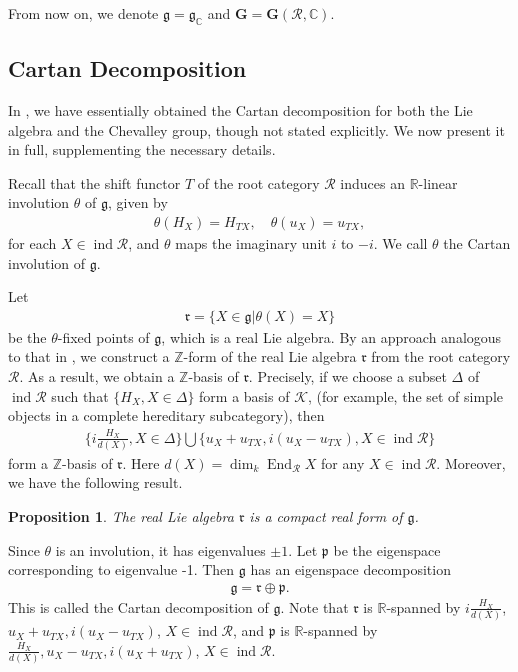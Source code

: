 \documentclass[12pt]{amsart}
\newtheorem{proposition}[theorem]{Proposition}
\begin{document}
From now on, we denote $\mathfrak{g}=\mathfrak{g}_{\mathbb{C}}$ and $\mathbf{G}=\mathbf{G}(\mathcal{R},\mathbb{C})$.

\subsection{Cartan Decomposition}

In \cite{notes2}, we have essentially obtained the Cartan decomposition for both the Lie algebra and the Chevalley group, though not stated explicitly.
We now present it in full, supplementing the necessary details.

Recall that the shift functor $T$ of the root category $\mathcal{R}$ induces an $\mathbb{R}$-linear involution $\theta$ of $\mathfrak{g}$, given by 
\begin{align*}
    \theta(H_X)=H_{TX}, \quad \theta(u_X)=u_{TX},
\end{align*}
for each $X\in \operatorname{ind}\mathcal{R}$, and $\theta$ maps the imaginary unit $i$ to $-i$. 
We call $\theta$ the Cartan involution of $\mathfrak{g}$.

Let 
\begin{align*}
    \mathfrak{r}=\{ X\in \mathfrak{g}| \theta(X)=X \}
\end{align*}
be the $\theta$-fixed points of $\mathfrak{g}$, which is a real Lie algebra.
By an approach analogous to that in \cite{1997ROOT}, we construct a $\mathbb{Z}$-form of the real Lie algebra $\mathfrak{r}$ from the root category $\mathcal{R}$.
As a result, we obtain a $\mathbb{Z}$-basis of $\mathfrak{r}$. 
Precisely, if we choose a subset $\Delta$ of $\operatorname{ind}\mathcal{R}$ such that $\{H_X,X\in \Delta\}$ form a basis of $\mathcal{K}$, (for example, the set of simple objects in a complete hereditary subcategory), then 
\begin{align*}
    \{i\frac{H_X}{d(X)},X\in \Delta\}\bigcup \{u_X+u_{TX},i(u_X-u_{TX}),X\in \operatorname{ind}\mathcal{R}\}
\end{align*}
form a $\mathbb{Z}$-basis of $\mathfrak{r}$. 
Here $d(X)=\operatorname{dim}_k\operatorname{End}_{\mathcal{R}}X$ for any $X\in \operatorname{ind}\mathcal{R}$.
Moreover, we have the following result.

\begin{proposition}
    \cite[Proposition 30]{notes2}
    The real Lie algebra $\mathfrak{r}$ is a compact real form of $\mathfrak{g}$.
\end{proposition}

Since $\theta$ is an involution, it has eigenvalues $\pm 1$.
Let $\mathfrak{p}$ be the eigenspace corresponding to eigenvalue -1. 
Then $\mathfrak{g}$ has an eigenspace decomposition
\begin{align*}
    \mathfrak{g}=\mathfrak{r}\oplus \mathfrak{p}.
\end{align*}
This is called the Cartan decomposition of $\mathfrak{g}$.
Note that $\mathfrak{r}$ is $\mathbb{R}$-spanned by $i\frac{H_X}{d(X)}$, $u_X+u_{TX},i(u_X-u_{TX})$, $X\in \operatorname{ind}\mathcal{R}$, and $\mathfrak{p}$ is $\mathbb{R}$-spanned by $\frac{H_X}{d(X)},u_X-u_{TX},i(u_X+u_{TX})$, $X\in \operatorname{ind}\mathcal{R}$.
\end{document}
